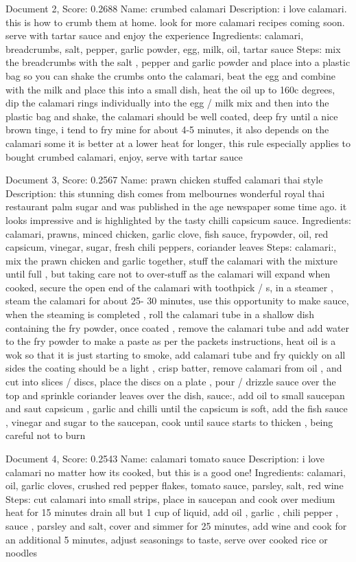 \documentclass[a4paper,11pt]{article}
\begin{document}
Document 2, Score: 0.2688
Name: crumbed calamari
Description: i love calamari. this is how to crumb them at home. look for more calamari recipes coming soon. serve with tartar sauce and enjoy the experience
Ingredients: calamari, breadcrumbs, salt, pepper, garlic powder, egg, milk, oil, tartar sauce
Steps: mix the breadcrumbs with the salt , pepper and garlic powder and place into a plastic bag so you can shake the crumbs onto the calamari, beat the egg and combine with the milk and place this into a small dish, heat the oil up to 160c degrees, dip the calamari rings individually into the egg / milk mix and then into the plastic bag and shake, the calamari should be well coated, deep fry until a nice brown tinge, i tend to fry mine for about 4-5 minutes, it also depends on the calamari some it is better at a lower heat for longer, this rule especially applies to bought crumbed calamari, enjoy, serve with tartar sauce

Document 3, Score: 0.2567
Name: prawn chicken stuffed calamari thai style
Description: this stunning dish comes from melbournes wonderful royal thai restaurant palm sugar and was published in the age newspaper some time ago.  it looks impressive and is highlighted by the tasty chilli capsicum sauce.
Ingredients: calamari, prawns, minced chicken, garlic clove, fish sauce, frypowder, oil, red capsicum, vinegar, sugar, fresh chili peppers, coriander leaves
Steps: calamari:, mix the prawn chicken and garlic together, stuff the calamari with the mixture until full , but taking care not to over-stuff as the calamari will expand when cooked, secure the open end of the calamari with toothpick / s, in a steamer , steam the calamari for about 25- 30 minutes, use this opportunity to make sauce, when the steaming is completed , roll the calamari tube in a shallow dish containing the fry powder, once coated , remove the calamari tube and add water to the fry powder to make a paste as per the packets instructions, heat oil is a wok so that it is just starting to smoke, add calamari tube and fry quickly on all sides the coating should be a light , crisp batter, remove calamari from oil , and cut into slices / discs, place the discs on a plate , pour / drizzle sauce over the top and sprinkle coriander leaves over the dish, sauce:, add oil to small saucepan and saut capsicum , garlic and chilli until the capsicum is soft, add the fish sauce , vinegar and sugar to the saucepan, cook until sauce starts to thicken , being careful not to burn

Document 4, Score: 0.2543
Name: calamari tomato sauce
Description: i love calamari no matter how its cooked, but this is a good one!
Ingredients: calamari, oil, garlic cloves, crushed red pepper flakes, tomato sauce, parsley, salt, red wine
Steps: cut calamari into small strips, place in saucepan and cook over medium heat for 15 minutes drain all but 1 cup of liquid, add oil , garlic , chili pepper , sauce , parsley and salt, cover and simmer for 25 minutes, add wine and cook for an additional 5 minutes, adjust seasonings to taste, serve over cooked rice or noodles
\end{document}
